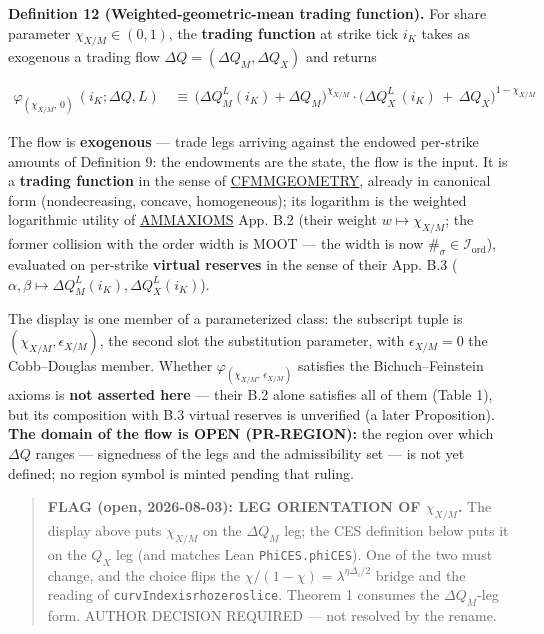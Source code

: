 \documentclass[11pt]{article}
\renewcommand{\_}{\textunderscore\allowbreak}
\begin{document}
\textbf{Definition 12 (Weighted-geometric-mean trading function).} For share parameter \(\chi_{X/M} \in (0,1)\), the \textbf{trading function} at strike tick \(i_K\) takes as exogenous a trading flow \(\Delta Q = (\Delta Q_M, \Delta Q_X)\) and returns

\[
    \begin{aligned}
        \varphi_{(\chi_{X/M},\,0)} \, (i_K ; \Delta Q , L)\, &\equiv \, \big(\Delta Q_M^{L} (i_K) + \Delta Q_M\big)^{\chi_{X/M}}\cdot\big(\Delta Q_X^L \, (i_K) \, + \, \Delta Q_X\big)^{1-\chi_{X/M}}
    \end{aligned}
\]

The flow is \textbf{exogenous} --- trade legs arriving against the endowed per-strike amounts of Definition 9: the endowments are the state, the flow is the input. It is a \textbf{trading function} in the sense of \href{../refs/cfmm/angeris-geometry_of_cfmms-2023.pdf}{CFMM\_GEOMETRY}, already in canonical form (nondecreasing, concave, homogeneous); its logarithm is the weighted logarithmic utility of \href{../refs/cfmm/bichuch_feinstein-axioms_for_amms-2022.pdf}{AMM\_AXIOMS} App. B.2 (their weight \(w \mapsto \chi_{X/M}\); the former collision with the order width is MOOT --- the width is now \(\#_{\sigma} \in \mathcal{I}_{\text{ord}}\)), evaluated on per-strike \textbf{virtual reserves} in the sense of their App. B.3 (\(\alpha, \beta \mapsto \Delta Q_M^L(i_K), \Delta Q_X^L(i_K)\)).

The display is one member of a parameterized class: the subscript tuple is \((\chi_{X/M}, \epsilon_{X/M})\), the second slot the substitution parameter, with \(\epsilon_{X/M} = 0\) the Cobb--Douglas member. Whether \(\varphi_{(\chi_{X/M},\,\epsilon_{X/M})}\) satisfies the Bichuch--Feinstein axioms is \textbf{not asserted here} --- their B.2 alone satisfies all of them (Table 1), but its composition with B.3 virtual reserves is unverified (a later Proposition). \textbf{The domain of the flow is OPEN (PR-REGION):} the region over which \(\Delta Q\) ranges --- signedness of the legs and the admissibility set --- is not yet defined; no region symbol is minted pending that ruling.

\begin{quote}
\textbf{FLAG (open, 2026-08-03): LEG ORIENTATION OF \(\chi_{X/M}\).} The display above puts \(\chi_{X/M}\) on the \(\Delta Q_M\) leg; the CES definition below puts it on the \(Q_X\) leg (and matches Lean \texttt{PhiCES.phiCES}). One of the two must change, and the choice flips the \(\chi/(1-\chi) = \lambda^{\eta\Delta_i/2}\) bridge and the reading of \texttt{curvIndex\_is\_rho\_zero\_slice}. Theorem 1 consumes the \(\Delta Q_M\)-leg form. AUTHOR DECISION REQUIRED --- not resolved by the rename.
\end{quote}
\end{document}
